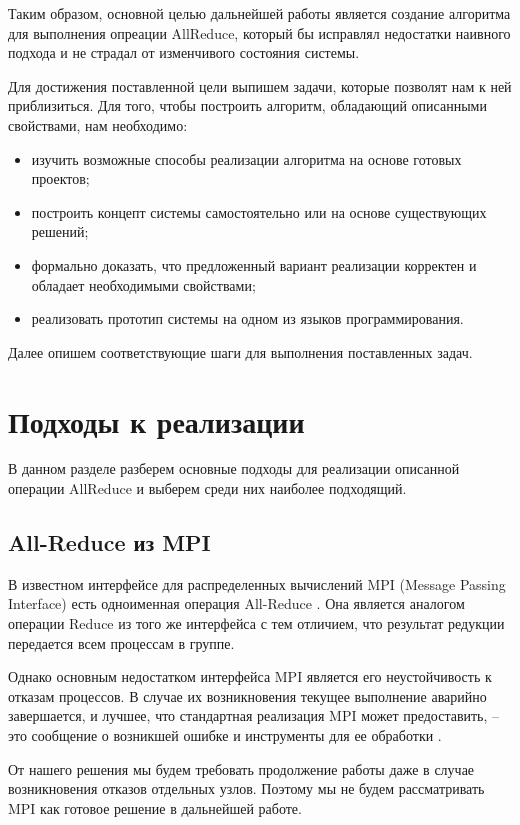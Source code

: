 \documentclass{article}
\theoremstyle{plain}
\theoremstyle{plain}
\theoremstyle{plain}
\theoremstyle{plain}
\theoremstyle{definition}
\theoremstyle{remark}
\theoremstyle{plain}
\begin{document}
Таким образом, основной целью дальнейшей работы является создание алгоритма для выполнения опреации AllReduce, который бы исправлял недостатки наивного подхода и не страдал от изменчивого состояния системы.

Для достижения поставленной цели выпишем задачи, которые позволят нам к ней приблизиться. Для того, чтобы построить алгоритм, обладающий описанными свойствами, нам необходимо:

\begin{itemize}
    \item изучить возможные способы реализации алгоритма на основе готовых проектов;
    \item построить концепт системы самостоятельно или на основе существующих решений;
    \item формально доказать, что предложенный вариант реализации корректен и обладает необходимыми свойствами;
    \item реализовать прототип системы на одном из языков программирования.
\end{itemize}

Далее опишем соответствующие шаги для выполнения поставленных задач.

\section{Подходы к реализации}

В данном разделе разберем основные подходы для реализации описанной операции AllReduce и выберем среди них наиболее подходящий.

\subsection{All-Reduce из MPI}

В известном интерфейсе для распределенных вычислений MPI (Message Passing In\-ter\-face) есть одноименная операция All-Reduce \cite[с.~238]{mpi_standard}. Она является аналогом операции Reduce из того же интерфейса с тем отличием, что результат редукции передается всем процессам в группе.

Однако основным недостатком интерфейса MPI является его неустойчивость к отказам процессов. В случае их возникновения текущее выполнение аварийно завершается, и лучшее, что стандартная реализация MPI может предоставить, -- это сообщение о возникшей ошибке и инструменты для ее обработки \cite[с.~26]{mpi_standard}.

От нашего решения мы будем требовать продолжение работы даже в случае возникновения отказов отдельных узлов. Поэтому мы не будем рассматривать MPI как готовое решение в дальнейшей работе.
\end{document}
